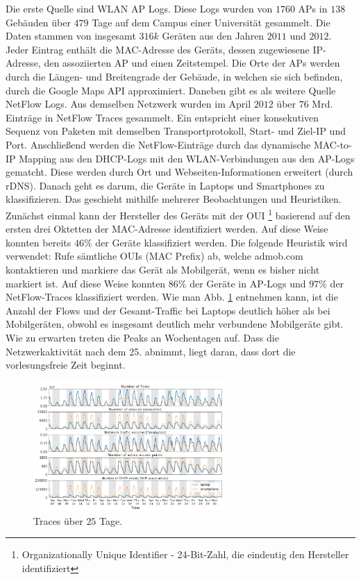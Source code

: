\documentclass[12pt, a4paper]{article}
\begin{document}
Die erste Quelle sind WLAN AP Logs. Diese Logs wurden von $1760$ APs in $138$ Gebäuden über $479$ Tage auf dem
Campus einer Universität gesammelt. Die Daten stammen von insgesamt $316k$ Geräten aus den Jahren $2011$ und $2012$.
Jeder Eintrag enthält die MAC-Adresse des Geräts, dessen zugewiesene IP-Adresse, den assoziierten AP und einen Zeitstempel.
Die Orte der APs werden durch die Längen- und Breitengrade der Gebäude, in welchen sie sich befinden, durch die Google Maps API
approximiert. Daneben gibt es als weitere Quelle NetFlow Logs. Aus demselben Netzwerk wurden im April $2012$ über $76$ Mrd.
Einträge in NetFlow Traces gesammelt. Ein  entspricht einer konsekutiven Sequenz von Paketen mit demselben
Transportprotokoll, Start- und Ziel-IP und Port.
\newline\newline
Anschließend werden die NetFlow-Einträge durch das dynamische MAC-to-IP Mapping aus den DHCP-Logs mit den WLAN-Verbindungen
aus den AP-Logs gematcht. Diese werden durch Ort und Webseiten-Informationen erweitert (durch rDNS).
\newline\newline
Danach geht es darum, die Geräte in Laptops und Smartphones zu klassifizieren. Das geschieht mithilfe
mehrerer Beobachtungen und Heuristiken. Zunächst einmal kann der Hersteller des Geräts mit der OUI
\footnote{Organizationally Unique Identifier - 24-Bit-Zahl, die eindeutig den Hersteller identifiziert} basierend auf den
ersten drei Oktetten der MAC-Adresse identifiziert werden. Auf diese Weise konnten bereits $46 \%$ der Geräte klassifiziert werden.
Die folgende Heuristik wird verwendet: Rufe sämtliche OUIs (MAC Prefix) ab, welche admob.com kontaktieren und markiere das Gerät
als Mobilgerät, wenn es bisher nicht markiert ist. Auf diese Weise konnten $86 \%$ der Geräte in AP-Logs und $97 \%$
der NetFlow-Traces klassifiziert werden. Wie man Abb. \ref{fig:traces} entnehmen kann, ist die Anzahl der Flows und der
Gesamt-Traffic bei Laptops deutlich höher als bei Mobilgeräten, obwohl es insgesamt deutlich mehr verbundene Mobilgeräte gibt.
Wie zu erwarten treten die Peaks an Wochentagen auf. Dass die Netzwerkaktivität nach dem 25. abnimmt, liegt daran, dass dort
die vorlesungsfreie Zeit beginnt.

\begin{figure}[H]
    \centering
    \includegraphics[width=0.65\textwidth]{img/traces.png}
    \caption{Traces über $25$ Tage. \cite{Alipour2018}}
    \label{fig:traces}
\end{figure}
\end{document}
